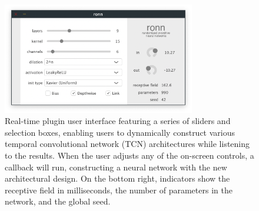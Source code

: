 \documentclass{article}
\begin{document}
\begin{figure}[h]
  \centering 
  \includegraphics[width=0.75\textwidth]{ronn-vst-ui.png}  
  \caption{Real-time plugin user interface featuring a series of sliders and selection boxes, 
  enabling users to dynamically construct various temporal convolutional network (TCN) architectures while listening to the results.
  When the user adjusts any of the on-screen controls, a callback will run, 
  constructing a neural network with the new architectural design. 
  On the bottom right, indicators show the receptive field in milliseconds, 
  the number of parameters in the network, and the global seed. 
  }
  \label{fig:ui}
\end{figure}

\vspace{0.4cm}
\end{document}

